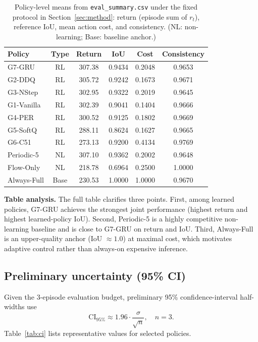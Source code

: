 \documentclass[letterpaper]{article}
\begin{document}
\begin{table}[H]
\centering
\scriptsize
\setlength{\tabcolsep}{3pt}
\begin{tabular}{lccccc}
\toprule
Policy & Type & Return & IoU & Cost & Consistency \\
\midrule
G7-GRU & RL & 307.38 & 0.9434 & 0.2048 & 0.9653 \\
G2-DDQ & RL & 305.72 & 0.9242 & 0.1673 & 0.9671 \\
G3-NStep & RL & 302.95 & 0.9322 & 0.2019 & 0.9645 \\
G1-Vanilla & RL & 302.39 & 0.9041 & 0.1404 & 0.9666 \\
G4-PER & RL & 300.52 & 0.9125 & 0.1802 & 0.9669 \\
G5-SoftQ & RL & 288.11 & 0.8624 & 0.1627 & 0.9665 \\
G6-C51 & RL & 273.13 & 0.9200 & 0.4134 & 0.9769 \\
Periodic-5 & NL & 307.10 & 0.9362 & 0.2002 & 0.9648 \\
Flow-Only & NL & 218.78 & 0.6964 & 0.2500 & 1.0000 \\
Always-Full & Base & 230.53 & 1.0000 & 1.0000 & 0.9670 \\
\bottomrule
\end{tabular}
\caption{Policy-level means from \texttt{eval\_summary.csv} under the fixed protocol in Section~\ref{sec:method}: return (episode sum of $r_t$), reference IoU, mean action cost, and consistency. (NL: non-learning; Base: baseline anchor.)}
\label{tab:summary_full}
\end{table}

\noindent\textbf{Table analysis.}
The full table clarifies three points. First, among learned policies, G7-GRU achieves the strongest joint performance (highest return and highest learned-policy IoU). Second, Periodic-5 is a highly competitive non-learning baseline and is close to G7-GRU on return and IoU. Third, Always-Full is an upper-quality anchor (IoU $\approx 1.0$) at maximal cost, which motivates adaptive control rather than always-on expensive inference.

\subsection{Preliminary uncertainty (95\% CI)}
\label{sec:uncertainty}
Given the 3-episode evaluation budget, preliminary 95\% confidence-interval half-widths use
\[
\text{CI}_{95\%} \approx 1.96 \cdot \frac{\sigma}{\sqrt{n}}, \quad n=3.
\]
Table~\ref{tab:ci} lists representative values for selected policies.
\end{document}
